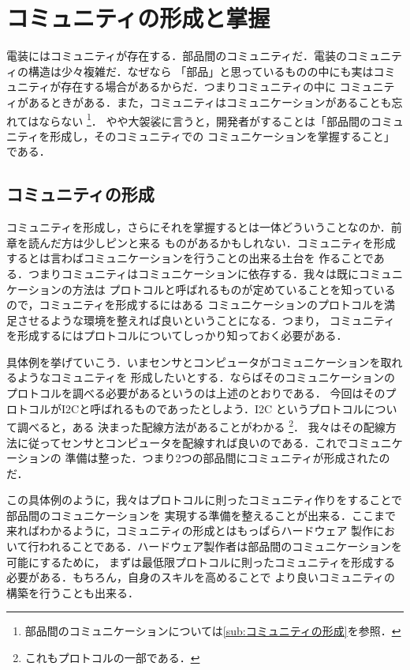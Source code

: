 \documentclass[dvipdfmx]{jsbook}
\begin{document}
\section{コミュニティの形成と掌握}

  電装にはコミュニティが存在する．部品間のコミュニティだ．電装のコミュニティの構造は少々複雑だ．なぜなら
  「部品」と思っているものの中にも実はコミュニティが存在する場合があるからだ．つまりコミュニティの中に
  コミュニティがあるときがある．また，コミュニティはコミュニケーションがあることも忘れてはならない
  \footnote{部品間のコミュニケーションについては\ref{sub:コミュニティの形成}を参照．}．
  やや大袈裟に言うと，開発者がすることは「部品間のコミュニティを形成し，そのコミュニティでの
  コミュニケーションを掌握すること」である．

\subsection{コミュニティの形成}

  コミュニティを形成し，さらにそれを掌握するとは一体どういうことなのか．前章を読んだ方は少しピンと来る
  ものがあるかもしれない．コミュニティを形成するとは言わばコミュニケーションを行うことの出来る土台を
  作ることである．つまりコミュニティはコミュニケーションに依存する．我々は既にコミュニケーションの方法は
  プロトコルと呼ばれるものが定めていることを知っているので，コミュニティを形成するにはある
  コミュニケーションのプロトコルを満足させるような環境を整えれば良いということになる．つまり，
  コミュニティを形成するにはプロトコルについてしっかり知っておく必要がある．

  具体例を挙げていこう．いまセンサとコンピュータがコミュニケーションを取れるようなコミュニティを
  形成したいとする．ならばそのコミュニケーションのプロトコルを調べる必要があるというのは上述のとおりである．
  今回はそのプロトコルがI2Cと呼ばれるものであったとしよう．I2C というプロトコルについて調べると，ある
  決まった配線方法があることがわかる
  \footnote{これもプロトコルの一部である．}．
  我々はその配線方法に従ってセンサとコンピュータを配線すれば良いのである．これでコミュニケーションの
  準備は整った．つまり2つの部品間にコミュニティが形成されたのだ．

  
  この具体例のように，我々はプロトコルに則ったコミュニティ作りをすることで部品間のコミュニケーションを
  実現する準備を整えることが出来る．ここまで来ればわかるように，コミュニティの形成とはもっぱらハードウェア
  製作において行われることである．ハードウェア製作者は部品間のコミュニケーションを可能にするために，
  まずは最低限プロトコルに則ったコミュニティを形成する必要がある．もちろん，自身のスキルを高めることで
  より良いコミュニティの構築を行うことも出来る．
\end{document}
